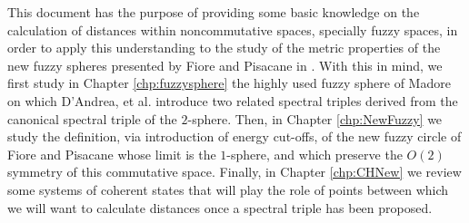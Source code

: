 This document has the purpose of providing some basic knowledge on the calculation of distances within noncommutative spaces, specially fuzzy spaces, in order to apply this understanding to the study of the metric properties of the new fuzzy spheres presented by Fiore and Pisacane in \cite{Fiore2018}. With this in mind, we first study in Chapter \ref{chp:fuzzysphere} the highly used fuzzy sphere of Madore \cite{Madore} on which D'Andrea, et al. \cite{DAndrea2013} introduce two related spectral triples derived from the canonical spectral triple of the $2$-sphere. Then, in Chapter \ref{chp:NewFuzzy} we study the definition, via introduction of energy cut-offs, of the new fuzzy circle of Fiore and Pisacane whose limit is the $1$-sphere, and which preserve the $O(2)$ symmetry of this commutative space. Finally, in Chapter \ref{chp:CHNew} we review some systems of coherent states that will play the role of points between which we will want to calculate distances once a spectral triple has been proposed.



 
    
    
    
